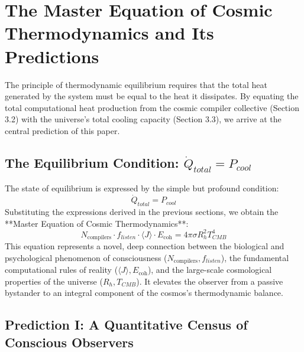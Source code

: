 \documentclass[11pt,a4paper]{article}
\theoremstyle{definition}
\theoremstyle{remark}
\begin{document}
\section{The Master Equation of Cosmic Thermodynamics and Its Predictions}

The principle of thermodynamic equilibrium requires that the total heat generated by the system must be equal to the heat it dissipates. By equating the total computational heat production from the cosmic compiler collective (Section 3.2) with the universe's total cooling capacity (Section 3.3), we arrive at the central prediction of this paper.

\subsection{The Equilibrium Condition: \(\dot{Q}_{total} = P_{cool}\)}

The state of equilibrium is expressed by the simple but profound condition:
\begin{equation}
    \dot{Q}_{total} = P_{cool}
\end{equation}
Substituting the expressions derived in the previous sections, we obtain the **Master Equation of Cosmic Thermodynamics**:
\begin{equation}
    \boxed{N_{\text{compilers}} \cdot f_{listen} \cdot \langle J \rangle \cdot E_{\text{coh}} = 4 \pi \sigma R_h^2 T_{CMB}^4}
\end{equation}
This equation represents a novel, deep connection between the biological and psychological phenomenon of consciousness (\(N_{\text{compilers}}, f_{listen}\)), the fundamental computational rules of reality (\(\langle J \rangle, E_{\text{coh}}\)), and the large-scale cosmological properties of the universe (\(R_h, T_{CMB}\)). It elevates the observer from a passive bystander to an integral component of the cosmos's thermodynamic balance.

\subsection{Prediction I: A Quantitative Census of Conscious Observers}
\end{document}
